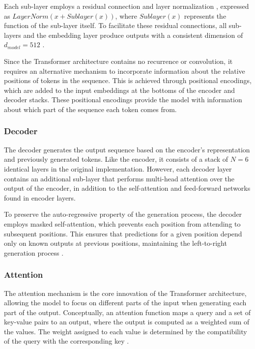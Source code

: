 Each sub-layer employs a residual connection \citep{he2015deepresiduallearningimage} and layer normalization \citep{ba2016layernormalization}, expressed as $LayerNorm(x + Sublayer(x))$, where $Sublayer(x)$ represents the function of the sub-layer itself. To facilitate these residual connections, all sub-layers and the embedding layer produce outputs with a consistent dimension of $d_{model} = 512$ \citep{vaswani2023attentionneed}.

Since the Transformer architecture contains no recurrence or convolution, it requires an alternative mechanism to incorporate information about the relative positions of tokens in the sequence. This is achieved through positional encodings, which are added to the input embeddings at the bottoms of the encoder and decoder stacks. These positional encodings provide the model with information about which part of the sequence each token comes from.

\subsubsection{Decoder}
\label{chap2:decoder}
The decoder generates the output sequence based on the encoder's representation and previously generated tokens. Like the encoder, it consists of a stack of $N = 6$ identical layers in the original implementation. However, each decoder layer contains an additional sub-layer that performs multi-head attention over the output of the encoder, in addition to the self-attention and feed-forward networks found in encoder layers.

To preserve the auto-regressive property of the generation process, the decoder employs masked self-attention, which prevents each position from attending to subsequent positions. This ensures that predictions for a given position depend only on known outputs at previous positions, maintaining the left-to-right generation process \citep{vaswani2023attentionneed}.

\subsubsection{Attention}
\label{chap2:attention}
The attention mechanism is the core innovation of the Transformer architecture, allowing the model to focus on different parts of the input when generating each part of the output. Conceptually, an attention function maps a query and a set of key-value pairs to an output, where the output is computed as a weighted sum of the values. The weight assigned to each value is determined by the compatibility of the query with the corresponding key \citep{vaswani2023attentionneed}.

